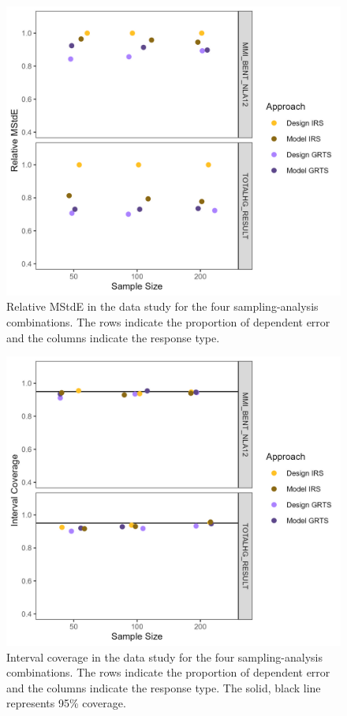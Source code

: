 \documentclass[]{elsarticle} %
\begin{document}
\begin{figure}
  \centering
  \includegraphics[width = 1\linewidth]{figures/data_mse_eff.jpeg}
  \caption{Relative MStdE in the data study for the four sampling-analysis combinations. The rows indicate the proportion of dependent error and the columns indicate the response type.}
  \label{fig:mse_eff}
\end{figure}

\begin{figure}
  \centering
  \includegraphics[width = 1\linewidth]{figures/data_coverage.jpeg}
  \caption{Interval coverage in the data study for the four sampling-analysis combinations. The rows indicate the proportion of dependent error and the columns indicate the response type. The solid, black line represents 95\% coverage.}
  \label{fig:figconf}
\end{figure}
\end{document}
